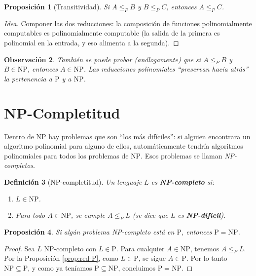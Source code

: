 \documentclass[11pt,a4paper]{article}
\theoremstyle{definicion}
\newtheorem{definicion}{Definición}[section]
\newtheorem{proposicion}[definicion]{Proposición}
\newtheorem{observacion}[definicion]{Observación}
\newcommand{\redP}{\leq_{P}}
\newcommand{\NP}{\mathrm{NP}}
\newcommand{\Pclass}{\mathrm{P}}
\begin{document}
\begin{proposicion}[Transitividad]
Si $A \redP B$ y $B \redP C$, entonces $A \redP C$.
\end{proposicion}

\begin{proof}[Idea]
Componer las dos reducciones: la composición de funciones polinomialmente computables es polinomialmente computable (la salida de la primera es polinomial en la entrada, y eso alimenta a la segunda).
\end{proof}

\begin{observacion}
También se puede probar (análogamente) que si $A \redP B$ y $B \in \NP$, entonces $A \in \NP$. Las reducciones polinomiales ``preservan hacia atrás'' la pertenencia a $\Pclass$ y a $\NP$.
\end{observacion}

\section{NP-Completitud}

Dentro de $\NP$ hay problemas que son ``los más difíciles'': si alguien encontrara un algoritmo polinomial para alguno de ellos, automáticamente tendría algoritmos polinomiales para todos los problemas de $\NP$. Esos problemas se llaman \emph{NP-completos}.

\begin{definicion}[NP-completitud]
Un lenguaje $L$ es \textbf{NP-completo} si:
\begin{enumerate}
    \item $L \in \NP$.
    \item Para todo $A \in \NP$, se cumple $A \redP L$ (se dice que $L$ es \textbf{NP-difícil}).
\end{enumerate}
\end{definicion}

\begin{proposicion}\label{prop:np-completo-p}
Si algún problema NP-completo está en $\Pclass$, entonces $\Pclass = \NP$.
\end{proposicion}

\begin{proof}
Sea $L$ NP-completo con $L \in \Pclass$. Para cualquier $A \in \NP$, tenemos $A \redP L$. Por la Proposición \ref{prop:red-P}, como $L \in \Pclass$, se sigue $A \in \Pclass$. Por lo tanto $\NP \subseteq \Pclass$, y como ya teníamos $\Pclass \subseteq \NP$, concluimos $\Pclass = \NP$.
\end{proof}
\end{document}
